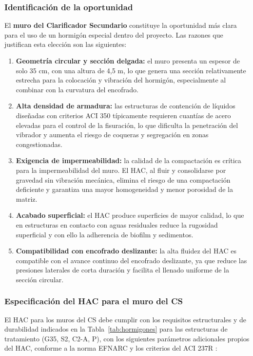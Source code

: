 \subsubsection{Identificación de la oportunidad}

El \textbf{muro del Clarificador Secundario} constituye la oportunidad más clara para el uso de un hormigón especial dentro del proyecto. Las razones que justifican esta elección son las siguientes:

\begin{enumerate}
    \item \textbf{Geometría circular y sección delgada:} el muro presenta un espesor de solo 35 cm, con una altura de 4{,}5 m, lo que genera una sección relativamente estrecha para la colocación y vibración del hormigón, especialmente al combinar con la curvatura del encofrado.
    \item \textbf{Alta densidad de armadura:} las estructuras de contención de líquidos diseñadas con criterios ACI 350 típicamente requieren cuantías de acero elevadas para el control de la fisuración, lo que dificulta la penetración del vibrador y aumenta el riesgo de coqueras y segregación en zonas congestionadas.
    \item \textbf{Exigencia de impermeabilidad:} la calidad de la compactación es crítica para la impermeabilidad del muro. El HAC, al fluir y consolidarse por gravedad sin vibración mecánica, elimina el riesgo de una compactación deficiente y garantiza una mayor homogeneidad y menor porosidad de la matriz.
    \item \textbf{Acabado superficial:} el HAC produce superficies de mayor calidad, lo que en estructuras en contacto con aguas residuales reduce la rugosidad superficial y con ello la adherencia de biofilm y sedimentos.
    \item \textbf{Compatibilidad con encofrado deslizante:} la alta fluidez del HAC es compatible con el avance continuo del encofrado deslizante, ya que reduce las presiones laterales de corta duración y facilita el llenado uniforme de la sección circular.
\end{enumerate}

\subsubsection{Especificación del HAC para el muro del CS}

El HAC para los muros del CS debe cumplir con los requisitos estructurales y de durabilidad indicados en la Tabla~\ref{tab:hormigones} para las estructuras de tratamiento (G35, S2, C2-A, P), con los siguientes parámetros adicionales propios del HAC, conforme a la norma EFNARC \cite{EFNARC} y los criterios del ACI 237R \cite{ACI237}:

